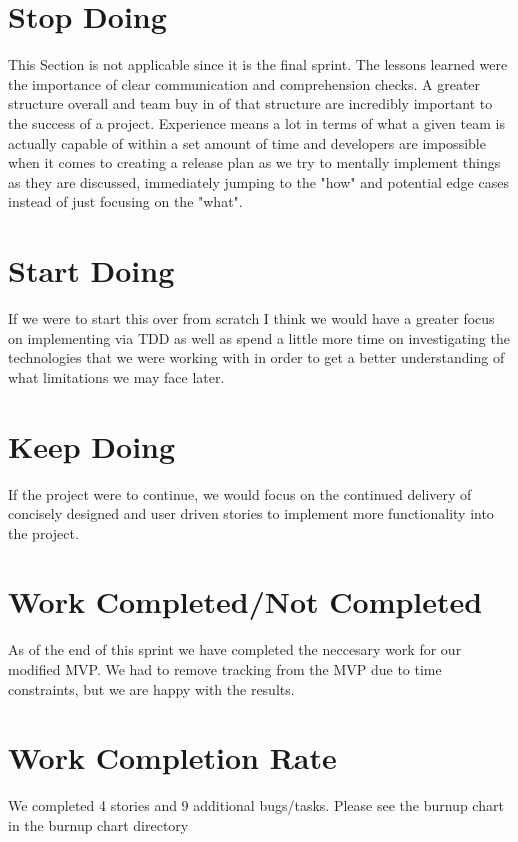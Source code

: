 \documentclass[12pt,letterpaper]{article}
\begin{document}
	\section*{Stop Doing}
		This Section is not applicable since it is the final sprint. The lessons learned were the importance of clear communication and comprehension checks. A greater structure overall and team buy in of that structure are incredibly important to the success of a project. Experience means a lot in terms of what a given team is actually capable of within a set amount of time and developers are impossible when it comes to creating a release plan as we try to mentally implement things as they are discussed, immediately jumping to the "how" and potential edge cases instead of just focusing on the "what".
	\section*{Start Doing}
		If we were to start this over from scratch I think we would have a greater focus on implementing via TDD as well as spend a little more time on investigating the technologies that we were working with in order to get a better understanding of what limitations we may face later.
	\section*{Keep Doing}
		If the project were to continue, we would focus on the continued delivery of concisely designed and user driven stories to implement more functionality into the project.
	\section*{Work Completed/Not Completed}
		As of the end of this sprint we have completed the neccesary work for our modified MVP. We had to remove tracking from the MVP due to time constraints, but we are happy with the results.
	\section*{Work Completion Rate}
		We completed 4 stories and 9 additional bugs/tasks. Please see the burnup chart in the burnup chart directory
\end{document}
